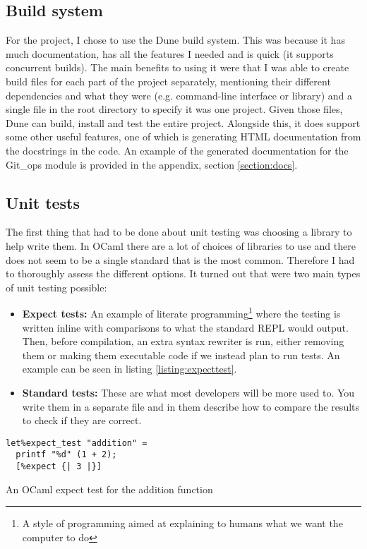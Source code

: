 \subsection{Build system}

For the project, I chose to use the Dune\cite{code_dune} build system. This was because it has much documentation, has all the features I needed and is quick (it supports concurrent builds). The main benefits to using it were that I was able to create build files for each part of the project separately, mentioning their different dependencies and what they were (e.g. command-line interface or library) and a single file in the root directory to specify it was one project. Given those files, Dune can build, install and test the entire project. Alongside this, it does support some other useful features, one of which is generating HTML documentation from the docstrings in the code. An example of the generated documentation for the Git\_ops module is provided in the appendix, section \ref{section:docs}.

\subsection{Unit tests}

The first thing that had to be done about unit testing was choosing a library to help write them. In OCaml there are a lot of choices of libraries to use and there does not seem to be a single standard that is the most common. Therefore I had to thoroughly assess the different options. It turned out that were two main types of unit testing possible:
\begin{itemize}
  \item \textbf{Expect tests:} An example of literate programming\footnote{A style of programming aimed at explaining to humans what we want the computer to do\cite{Knuth1984}} where the testing is written inline with comparisons to what the standard REPL would output. Then, before compilation, an extra syntax rewriter is run, either removing them or making them executable code if we instead plan to run tests. An example can be seen in listing \ref{listing:expecttest}.
  \item \textbf{Standard tests:} These are what most developers will be more used to. You write them in a separate file and in them describe how to compare the results to check if they are correct.
\end{itemize}

\begin{listing}[h]
\begin{verbatim}
let%expect_test "addition" =
  printf "%d" (1 + 2);
  [%expect {| 3 |}]
\end{verbatim}
\caption{An OCaml expect test for the addition function}
\label{listing:expecttest}
\end{listing}

